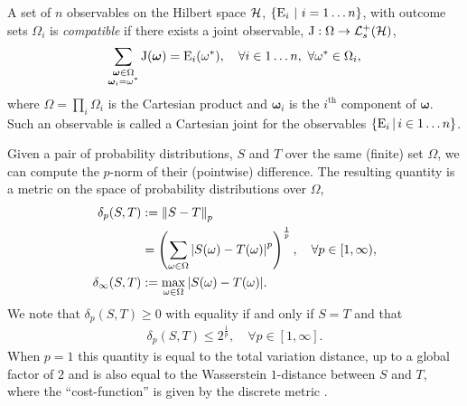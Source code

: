 A set of $n$ observables on the Hilbert space $\mathcal{H}$, $\left\{\operatorname{E}_i\,\,\middle|\,\,i=1\hdots n\right\}$, with outcome sets $\Omega_i$ is \emph{compatible} if there exists a joint observable, $\opj: \Omega \to \posops[\hcal]$,
\begin{align}
  \label{eqn:cart-joint}
  \sum_{\substack{\bm{\omega}\in\Omega\\\bm{\omega}_i = \omega^*}}\operatorname{J}(\bm{\omega}) = \operatorname{E}_i(\omega^*), \quad \forall i\in 1\hdots n,\ \forall \omega^*\in\Omega_i,
\end{align}
where $\Omega = \prod_i \Omega_i$ is the Cartesian product and $\bm{\omega}_i$ is the $i^\text{th}$ component of $\bm{\omega}$. Such an observable is called a Cartesian joint for the observables $\left\{\operatorname{E}_i\,\middle|\,i\in 1\hdots n\right\}$.

Given a pair of probability distributions, $S$ and $T$  over the same (finite) set $\Omega$, we can compute the $p$-norm of their (pointwise) difference. The resulting quantity is a metric on the space of probability distributions over $\Omega$,
\begin{align}
  \delta_p(S,T) &\defeq \pnorm{S - T}\\
                 &= \left(\sum_{\omega\in\Omega}\abs{S(\omega) - T(\omega)}^p\right)^{\frac{1}{p}}, \quad \forall p\in[1,\infty),\\
  \delta_\infty(S,T) &\defeq \max_{\omega\in\Omega}\abs{S(\omega) - T(\omega)}.
\end{align}
We note that $\delta_p(S,T) \geq 0$ with equality if and only if $S = T$ and that
\begin{align}
  \delta_p(S,T) \leq 2^{\frac{1}{p}}, \quad \forall p\in [1,\infty].
\end{align}
When $p=1$ this quantity is equal to the total variation distance, up to a global factor of $2$ and is also equal to the Wasserstein $1$-distance between $S$ and $T$, where the ``cost-function'' is given by the discrete metric \cites{markov-mixing-levin-peres-wilmer}{optimal-transport-villani}.

